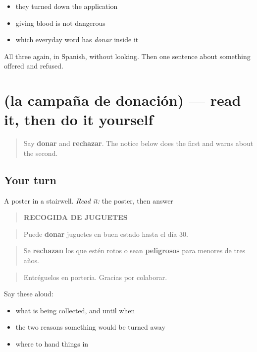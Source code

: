 \begin{itemize}
\raggedright
  \item they turned down the application
  \item giving blood is not dangerous
  \item which everyday word has \emph{donar} inside it
\end{itemize}

\begin{tcolorbox}[breakable,colback=teal!4,colframe=teal!35!black,title={Before you move on}]
All three again, in Spanish, without looking. Then one sentence about something offered and refused.
\end{tcolorbox}
\section[Practice]{(la campaña de donación) — read it, then do it yourself}

\label{lesson:ES-C461-sintesis-donar}



\begin{quote}
Say \textbf{donar} and \textbf{rechazar}. The notice below does the first and warns about the second.
\end{quote}

\subsection*{Your turn}
A poster in a stairwell. \emph{Read it:} the poster, then answer

\begin{quote}
\textbf{RECOGIDA DE JUGUETES}
\end{quote}

\begin{quote}
Puede \textbf{donar} juguetes en buen estado hasta el día 30.
\end{quote}

\begin{quote}
Se \textbf{rechazan} los que estén rotos o sean \textbf{peligrosos} para menores de tres años.
\end{quote}

\begin{quote}
Entréguelos en portería. Gracias por colaborar.
\end{quote}

Say these aloud:

\begin{itemize}
\raggedright
  \item what is being collected, and until when
  \item the two reasons something would be turned away
  \item where to hand things in
\end{itemize}

